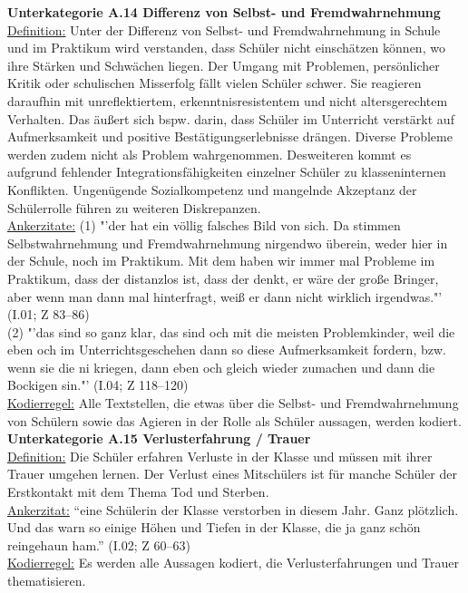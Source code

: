 \noindent
\textbf{Unterkategorie A.14 Differenz von Selbst- und Fremdwahrnehmung}\\
\underline{Definition:} Unter der Differenz von Selbst- und Fremdwahrnehmung in Schule und im Praktikum wird verstanden, dass Schüler nicht einschätzen können, wo ihre Stärken und Schwächen liegen. Der Umgang mit Problemen, persönlicher Kritik oder schulischen Misserfolg fällt vielen Schüler schwer. Sie reagieren daraufhin mit unreflektiertem, erkenntnisresistentem und nicht altersgerechtem Verhalten. Das äußert sich bspw. darin, dass Schüler im Unterricht verstärkt auf Aufmerksamkeit und positive Bestätigungserlebnisse drängen. Diverse Probleme werden zudem nicht als Problem wahrgenommen. Desweiteren kommt es aufgrund fehlender Integrationsfähigkeiten einzelner Schüler zu klasseninternen Konflikten. Ungenügende Sozialkompetenz und mangelnde Akzeptanz der Schülerrolle führen zu weiteren Diskrepanzen.\\
\underline{Ankerzitate:} (1) "'der hat ein völlig falsches Bild von sich. Da stimmen Selbstwahrnehmung und Fremdwahrnehmung nirgendwo überein, weder hier in der Schule, noch im Praktikum. Mit dem haben wir immer mal Probleme im Praktikum, dass der distanzlos ist, dass der denkt, er wäre der große Bringer, aber wenn man dann mal hinterfragt, weiß er dann nicht wirklich irgendwas."' (I.01; Z 83--86)\\ (2) "'das sind so ganz klar, das sind och mit die meisten Problemkinder, weil die eben och im Unterrichtsgeschehen dann so diese Aufmerksamkeit fordern, bzw.  wenn sie die ni kriegen, dann eben och gleich wieder zumachen und dann die Bockigen sin."' (I.04; Z 118--120)\\
\underline{Kodierregel:} Alle Textstellen, die etwas über die Selbst- und Fremdwahrnehmung von Schülern sowie das Agieren in der Rolle als Schüler aussagen, werden kodiert.\\

\noindent
\textbf{Unterkategorie A.15 Verlusterfahrung / Trauer}\\
\underline{Definition:} Die Schüler erfahren Verluste in der Klasse und müssen mit ihrer Trauer umgehen lernen. Der Verlust eines Mitschülers ist für manche Schüler der Erstkontakt mit dem Thema Tod und Sterben.\\
\underline{Ankerzitat:} "`eine Schülerin der Klasse verstorben in diesem Jahr. Ganz plötzlich. Und das warn so einige Höhen und Tiefen in der Klasse, die ja ganz schön reingehaun ham."' (I.02; Z 60--63)\\
\underline{Kodierregel:} Es werden alle Aussagen kodiert, die Verlusterfahrungen und Trauer thematisieren.\\

